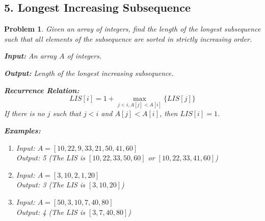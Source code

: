 \documentclass{article}
\newtheorem{problem}{Problem}
\begin{document}
\subsection*{5. Longest Increasing Subsequence}
\begin{problem}
Given an array of integers, find the length of the longest subsequence such that all elements of the subsequence are sorted in strictly increasing order.

\textbf{Input:} An array $A$ of integers.

\textbf{Output:} Length of the longest increasing subsequence.

\textbf{Recurrence Relation:}
\[
LIS[i] = 1 + \max_{j < i, A[j] < A[i]} \{LIS[j]\}
\]
If there is no $j$ such that $j < i$ and $A[j] < A[i]$, then $LIS[i] = 1$.

\textbf{Examples:}
\begin{enumerate}
\item Input: $A = [10, 22, 9, 33, 21, 50, 41, 60]$ \\
      Output: 5 (The LIS is $[10, 22, 33, 50, 60]$ or $[10, 22, 33, 41, 60]$)
\item Input: $A = [3, 10, 2, 1, 20]$ \\
      Output: 3 (The LIS is $[3, 10, 20]$)
\item Input: $A = [50, 3, 10, 7, 40, 80]$ \\
      Output: 4 (The LIS is $[3, 7, 40, 80]$)
\end{enumerate}
\end{problem}

\end{document}
